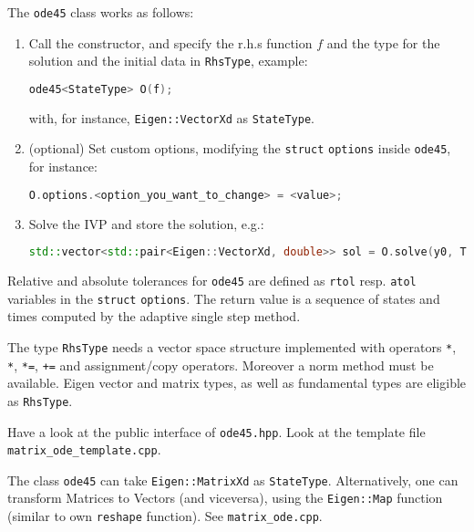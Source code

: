\begin{problem}
\begin{subproblem}[1]
\begin{subproblem}[1]
\begin{hint}
The \verb|ode45| class works as follows:
\begin{enumerate}
 \item Call the constructor, and specify the r.h.s function $f$ and the type for the solution and the initial data in \verb|RhsType|, example:
 \begin{lstlisting}[language=c++]
ode45<StateType> O(f);
 \end{lstlisting}
 with, for instance, \verb|Eigen::VectorXd| as \verb|StateType|.
 \item (optional) Set custom options, modifying the \verb|struct| \verb|options| inside \verb|ode45|, for instance:
 \begin{lstlisting}[language=c++]
O.options.<option_you_want_to_change> = <value>;
 \end{lstlisting}
 \item Solve the IVP and store the solution, e.g.:
 \begin{lstlisting}[language=c++]
std::vector<std::pair<Eigen::VectorXd, double>> sol = O.solve(y0, T);
 \end{lstlisting}
\end{enumerate}
Relative and absolute tolerances for \verb|ode45| are defined as \verb|rtol|
resp. \verb|atol| variables in the \verb|struct| \verb|options|. The return value
is a sequence of states and times computed by the adaptive single step method.
\end{hint}

\begin{hint}
The type \verb|RhsType| needs a vector space structure implemented with operators \verb|*|, \verb|*|,  \verb|*=|, \verb|+=| and assignment/copy operators. Moreover a norm method must be available. Eigen vector and matrix types, as well as fundamental types are eligible as \verb|RhsType|.
\end{hint}

\begin{hint}
 Have a look at the public interface of \verb|ode45.hpp|. Look at the template file \verb|matrix_ode_template.cpp|.
\end{hint}

\cprotEnv \begin{solution}
 The class \verb|ode45| can take \verb|Eigen::MatrixXd| as \verb|StateType|. Alternatively, one can transform Matrices to Vectors (and viceversa), using the \verb|Eigen::Map| function (similar to \Matlab{} own \verb|reshape| function). See \verb|matrix_ode.cpp|.
\end{solution}


\end{subproblem}
\end{subproblem}
\end{problem}
